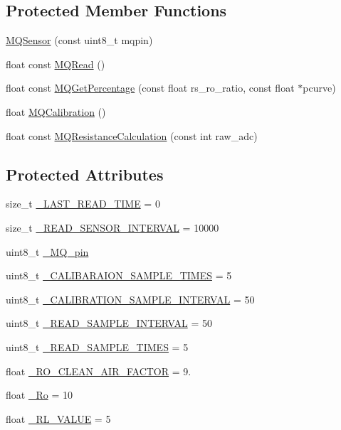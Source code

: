 \subsection*{Protected Member Functions}
\begin{DoxyCompactItemize}
\item 
\hyperlink{class_m_q_sensor_a58bc8dbc8dc2e97584a34f1a545f93e1}{M\+Q\+Sensor} (const uint8\+\_\+t mqpin)
\item 
float const \hyperlink{class_m_q_sensor_ac769cc3eade7067313d185848f63f2cf}{M\+Q\+Read} ()
\item 
float const \hyperlink{class_m_q_sensor_a92ef594a160b257ca124481a21840a96}{M\+Q\+Get\+Percentage} (const float rs\+\_\+ro\+\_\+ratio, const float $\ast$pcurve)
\item 
float \hyperlink{class_m_q_sensor_aae67f9f2749712bd2afa90a2a97a29fd}{M\+Q\+Calibration} ()
\item 
float const \hyperlink{class_m_q_sensor_a1bb39a92869446ede5ba1c6854034e20}{M\+Q\+Resistance\+Calculation} (const int raw\+\_\+adc)
\end{DoxyCompactItemize}
\subsection*{Protected Attributes}
\begin{DoxyCompactItemize}
\item 
size\+\_\+t \hyperlink{class_m_q_sensor_a464b0db94d80b771efca70a0eb58f951}{\+\_\+\+L\+A\+S\+T\+\_\+\+R\+E\+A\+D\+\_\+\+T\+I\+ME} = 0
\item 
size\+\_\+t \hyperlink{class_m_q_sensor_a4a8e710f1bc61afb702d26ceb1366f11}{\+\_\+\+R\+E\+A\+D\+\_\+\+S\+E\+N\+S\+O\+R\+\_\+\+I\+N\+T\+E\+R\+V\+AL} = 10000
\item 
uint8\+\_\+t \hyperlink{class_m_q_sensor_aaa75c5a8dbb6b8bfba63a7b8749acd82}{\+\_\+\+M\+Q\+\_\+pin}
\item 
uint8\+\_\+t \hyperlink{class_m_q_sensor_ae04756d16f8d90e492fdb48c5ac4e930}{\+\_\+\+C\+A\+L\+I\+B\+A\+R\+A\+I\+O\+N\+\_\+\+S\+A\+M\+P\+L\+E\+\_\+\+T\+I\+M\+ES} = 5
\item 
uint8\+\_\+t \hyperlink{class_m_q_sensor_a440f40e2d8109c9cda26ce2b3d8ff564}{\+\_\+\+C\+A\+L\+I\+B\+R\+A\+T\+I\+O\+N\+\_\+\+S\+A\+M\+P\+L\+E\+\_\+\+I\+N\+T\+E\+R\+V\+AL} = 50
\item 
uint8\+\_\+t \hyperlink{class_m_q_sensor_a7dcb6e9f9ff88b498d7b47dd33b0809f}{\+\_\+\+R\+E\+A\+D\+\_\+\+S\+A\+M\+P\+L\+E\+\_\+\+I\+N\+T\+E\+R\+V\+AL} = 50
\item 
uint8\+\_\+t \hyperlink{class_m_q_sensor_a3c6ba8a07087b67ee99941bced73e940}{\+\_\+\+R\+E\+A\+D\+\_\+\+S\+A\+M\+P\+L\+E\+\_\+\+T\+I\+M\+ES} = 5
\item 
float \hyperlink{class_m_q_sensor_adc7e7af2139868a784d31d27d73b7df3}{\+\_\+\+R\+O\+\_\+\+C\+L\+E\+A\+N\+\_\+\+A\+I\+R\+\_\+\+F\+A\+C\+T\+OR} = 9.
\item 
float \hyperlink{class_m_q_sensor_ade2e483ebc557d1caf753d41a8b3afde}{\+\_\+\+Ro} = 10
\item 
float \hyperlink{class_m_q_sensor_a2cf9585b95f5beaac2dc8edbab7eff42}{\+\_\+\+R\+L\+\_\+\+V\+A\+L\+UE} = 5
\end{DoxyCompactItemize}


